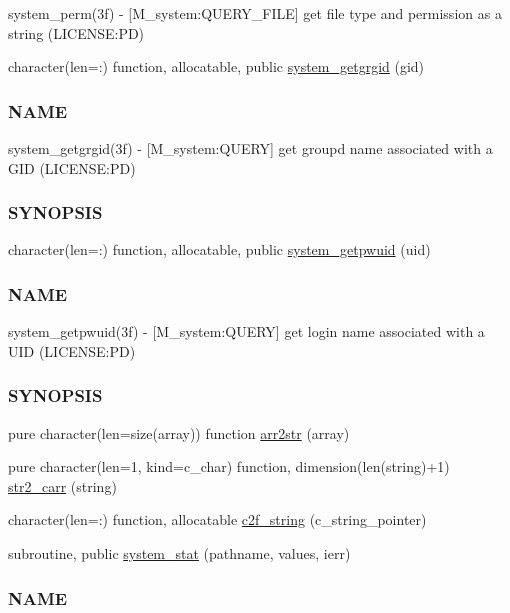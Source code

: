 \begin{DoxyCompactItemize}
\begin{DoxyCompactList}
system\+\_\+perm(3f) -\/ \mbox{[}M\+\_\+system\+:Q\+U\+E\+R\+Y\+\_\+\+F\+I\+LE\mbox{]} get file type and permission as a string (L\+I\+C\+E\+N\+SE\+:PD) \end{DoxyCompactList}\item 
character(len=\+:) function, allocatable, public \mbox{\hyperlink{namespacem__system_aec137429fbb8c848db4ecd914466d7e8}{system\+\_\+getgrgid}} (gid)
\begin{DoxyCompactList}\small\item\em \subsubsection*{N\+A\+ME}

system\+\_\+getgrgid(3f) -\/ \mbox{[}M\+\_\+system\+:Q\+U\+E\+RY\mbox{]} get groupd name associated with a G\+ID (L\+I\+C\+E\+N\+SE\+:PD) \subsubsection*{S\+Y\+N\+O\+P\+S\+IS}\end{DoxyCompactList}\item 
character(len=\+:) function, allocatable, public \mbox{\hyperlink{namespacem__system_a59cd13de95dc9a65b444f02614ea39ce}{system\+\_\+getpwuid}} (uid)
\begin{DoxyCompactList}\small\item\em \subsubsection*{N\+A\+ME}

system\+\_\+getpwuid(3f) -\/ \mbox{[}M\+\_\+system\+:Q\+U\+E\+RY\mbox{]} get login name associated with a U\+ID (L\+I\+C\+E\+N\+SE\+:PD) \subsubsection*{S\+Y\+N\+O\+P\+S\+IS}\end{DoxyCompactList}\item 
pure character(len=size(array)) function \mbox{\hyperlink{namespacem__system_aeb3d7d4cb39d59917910a3ae2532206d}{arr2str}} (array)
\item 
pure character(len=1, kind=c\+\_\+char) function, dimension(len(string)+1) \mbox{\hyperlink{namespacem__system_a58bb591b5b9fefec3960a28361aae07a}{str2\+\_\+carr}} (string)
\item 
character(len=\+:) function, allocatable \mbox{\hyperlink{namespacem__system_aa7c5445619aa15cd2301fe17f7c3b73c}{c2f\+\_\+string}} (c\+\_\+string\+\_\+pointer)
\item 
subroutine, public \mbox{\hyperlink{namespacem__system_a5bb1ebcebe181e07fd24e908cacc9887}{system\+\_\+stat}} (pathname, values, ierr)
\begin{DoxyCompactList}\small\item\em \subsubsection*{N\+A\+ME}


\end{DoxyCompactList}
\end{DoxyCompactItemize}

